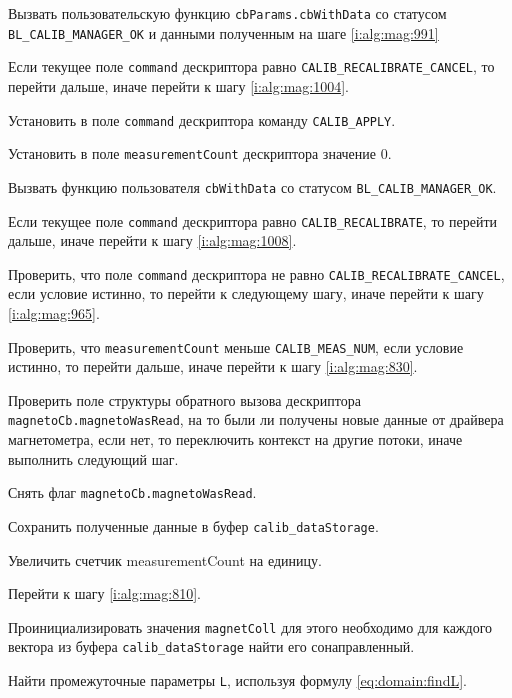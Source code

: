 \begin{enumerate_step}
    \item Вызвать пользовательскую функцию \lstinline|cbParams.cbWithData| со статусом \lstinline|BL_CALIB_MANAGER_OK| и данными полученным на шаге \ref{i:alg:mag:991}
    \item \label{i:alg:mag:997} Если текущее поле \lstinline|command| дескриптора равно \lstinline|CALIB_RECALIBRATE_CANCEL|, то перейти дальше, иначе перейти к шагу
    \ref{i:alg:mag:1004}.
    \item Установить в поле \lstinline|command| дескриптора команду \lstinline|CALIB_APPLY|.
    \item Установить в поле \lstinline|measurementCount| дескриптора значение 0.
    \item Вызвать функцию пользователя \lstinline|cbWithData| со статусом \lstinline|BL_CALIB_MANAGER_OK|.
    \item \label{i:alg:mag:1004} Если текущее поле \lstinline|command| дескриптора равно \lstinline|CALIB_RECALIBRATE|, то перейти дальше, иначе перейти к шагу
    \ref{i:alg:mag:1008}.
    \item \label{i:alg:mag:810} Проверить, что поле \lstinline|command| дескриптора не равно \lstinline|CALIB_RECALIBRATE_CANCEL|, если условие истинно, то перейти к следующему шагу, иначе
    перейти к шагу \ref{i:alg:mag:965}.
    \item Проверить, что \lstinline|measurementCount| меньше \lstinline|CALIB_MEAS_NUM|, если условие истинно, то перейти дальше, иначе перейти к шагу \ref{i:alg:mag:830}.
    \item Проверить поле структуры обратного вызова дескриптора \lstinline|magnetoCb.magnetoWasRead|, на то были ли получены новые данные от драйвера магнетометра, 
    если нет, то переключить контекст на другие потоки, иначе выполнить следующий шаг.
    \item Снять флаг \lstinline|magnetoCb.magnetoWasRead|.
    \item Сохранить полученные данные в буфер \lstinline|calib_dataStorage|.
    \item Увеличить счетчик measurementCount на единицу.
    \item Перейти к шагу \ref{i:alg:mag:810}.
    \item \label{i:alg:mag:830} Проинициализировать значения \lstinline|magnetColl| для этого необходимо для каждого вектора из буфера \lstinline|calib_dataStorage| найти его сонаправленный.
    \item \label{i:alg:mag:FindL} Найти промежуточные параметры \lstinline|L|, используя формулу \ref{eq:domain:findL}.

\end{enumerate_step}

